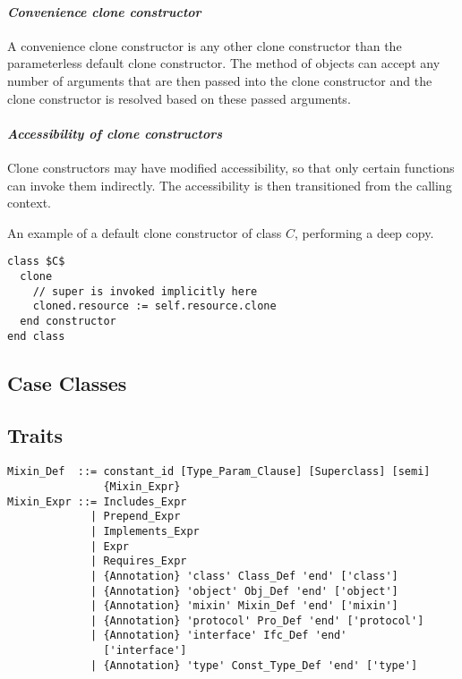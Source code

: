\paragraph{\em Convenience clone constructor}
A convenience clone constructor is any other clone constructor than the parameterless default clone constructor. The  method of objects can accept any number of arguments that are then passed into the clone constructor and the clone constructor is resolved based on these passed arguments. 

\paragraph{\em Accessibility of clone constructors}
Clone constructors may have modified accessibility, so that only certain functions can invoke them indirectly. The accessibility is then transitioned from the calling context. 

\example An example of a default clone constructor of class $C$, performing a deep copy. 
\begin{lstlisting}
class $C$
  clone
    // super is invoked implicitly here
    cloned.resource := self.resource.clone
  end constructor
end class
\end{lstlisting}

\subsection{Case Classes}
\label{sec:case-classes}

\subsection{Traits}
\label{sec:traits}

\syntax\begin{lstlisting}
Mixin_Def  ::= constant_id [Type_Param_Clause] [Superclass] [semi] 
               {Mixin_Expr}
Mixin_Expr ::= Includes_Expr
             | Prepend_Expr
             | Implements_Expr
             | Expr
             | Requires_Expr
             | {Annotation} 'class' Class_Def 'end' ['class']
             | {Annotation} 'object' Obj_Def 'end' ['object']
             | {Annotation} 'mixin' Mixin_Def 'end' ['mixin']
             | {Annotation} 'protocol' Pro_Def 'end' ['protocol']
             | {Annotation} 'interface' Ifc_Def 'end' 
               ['interface']
             | {Annotation} 'type' Const_Type_Def 'end' ['type']
\end{lstlisting}

